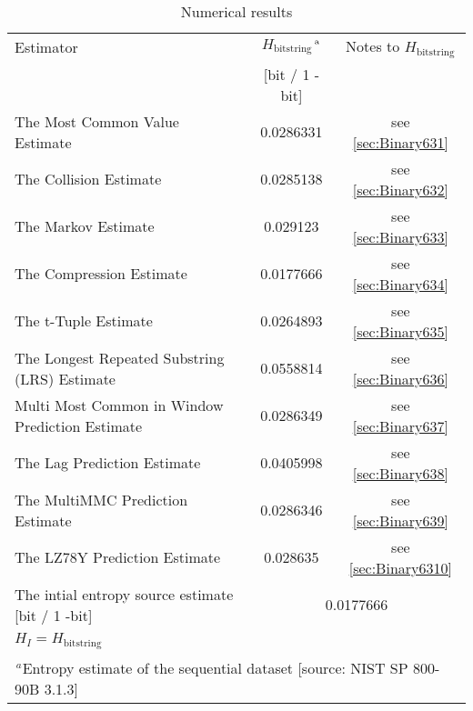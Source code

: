 \documentclass[a3paper,xelatex,english]{bxjsarticle}
\begin{document}
\begin{table}[h]
\caption{Numerical results}
\begin{center}
\begin{tabular}{|l|c|c|}
\hline 
\rowcolor{anotherlightblue} %
Estimator										& $H_{\textrm{bitstring}}$$^{\textrm{\,a}}$ & Notes to $H_{\textrm{bitstring}}$	\\ 
\cline{2-3}
\rowcolor{anotherlightblue} %
\,												& [bit / 1 - bit] & \,		\\
\hline 
The Most Common Value Estimate					& 0.0286331& see \ref{sec:Binary631} \\
\hline 
The Collision Estimate							& 0.0285138& see \ref{sec:Binary632} \\
\hline 
The Markov Estimate								& 0.029123& see \ref{sec:Binary633} \\
\hline 
The Compression Estimate						& 0.0177666& see \ref{sec:Binary634} \\
\hline 
The t-Tuple Estimate							& 0.0264893& see \ref{sec:Binary635} \\
\hline 
The Longest Repeated Substring (LRS) Estimate	& 0.0558814& see \ref{sec:Binary636} \\
\hline 
Multi Most Common in Window Prediction Estimate	& 0.0286349& see \ref{sec:Binary637} \\
\hline 
The Lag Prediction Estimate						& 0.0405998& see \ref{sec:Binary638} \\
\hline 
The MultiMMC Prediction Estimate				& 0.0286346& see \ref{sec:Binary639} \\
\hline 
The LZ78Y Prediction Estimate					& 0.028635& see \ref{sec:Binary6310} \\
\hline \hline 
The intial entropy source estimate [bit / 1 -bit]	& \multicolumn{2}{|c|}{0.0177666}	\\
$H_{I} = H_{\textrm{bitstring}}$ & \multicolumn{2}{|c|}{ \, } 	\\
\hline \hline 
\multicolumn{3}{|l|}{$^{\,a}$\quad Entropy estimate of the sequential dataset [source: NIST SP 800-90B \cite{SP80090B} 3.1.3]} \\
\hline 
\end{tabular}
\end{center}
\end{table}
\end{document}
